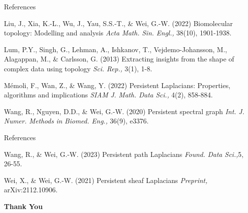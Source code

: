 \documentclass[aspectratio=169,xcolor=dvipsnames]{beamer}
\begin{document}
\begin{frame}{References}
    \footnotesize{
        \begin{thebibliography}{99}
             Liu, J., Xia, K.-L., Wu, J., Yau, S.S.-T., \& Wei, G.-W. (2022)
            \newblock Biomolecular topology: Modelling and analysis
            \newblock \emph{Acta Math. Sin. Engl.,} 38(10), 1901-1938.
        \end{thebibliography}
        \begin{thebibliography}{99}
             Lum, P.Y., Singh, G., Lehman, A., Ishkanov, T., Vejdemo-Johansson, M., Alagappan, M., \& Carlsson, G. (2013)
            \newblock Extracting insights from the shape of complex data using topology
            \newblock \emph{ Sci. Rep.,} 3(1), 1-8.
        \end{thebibliography}
        \begin{thebibliography}{99}
             Mémoli, F., Wan, Z., \& Wang, Y. (2022)
            \newblock Persistent Laplacians: Properties, algorithms and implications
            \newblock \emph{SIAM J. Math. Data Sci.,} 4(2), 858-884.
        \end{thebibliography}
        \begin{thebibliography}{99}
             Wang, R., Nguyen, D.D., \& Wei, G.-W. (2020)
            \newblock Persistent spectral graph
            \newblock \emph{Int. J. Numer. Methods in Biomed. Eng.,} 36(9), e3376.
        \end{thebibliography}
    }
\end{frame}

\begin{frame}{References}
    \footnotesize{
        \begin{thebibliography}{99}
               Wang, R., \& Wei, G.-W. (2023)
            \newblock Persistent path Laplacians
            \newblock \emph{Found. Data Sci.,}5, 26-55.
        \end{thebibliography}
        \begin{thebibliography}{99}
             Wei, X., \& Wei, G.-W. (2021)
            \newblock Persistent sheaf Laplacians
            \newblock \emph{Preprint,} arXiv:2112.10906.
        \end{thebibliography}
}
\end{frame}


\begin{frame}
    \Huge{\centerline{\textbf{Thank You}}}
\end{frame}

\end{document}
